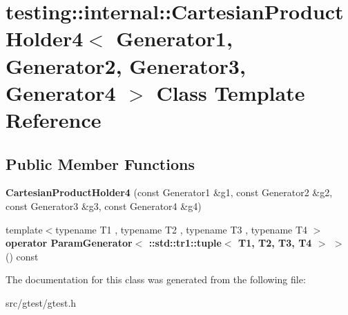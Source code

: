 \hypertarget{classtesting_1_1internal_1_1_cartesian_product_holder4}{}\section{testing\+:\+:internal\+:\+:Cartesian\+Product\+Holder4$<$ Generator1, Generator2, Generator3, Generator4 $>$ Class Template Reference}
\label{classtesting_1_1internal_1_1_cartesian_product_holder4}
\subsection*{Public Member Functions}
\begin{DoxyCompactItemize}
\item 
\mbox{\label{classtesting_1_1internal_1_1_cartesian_product_holder4_a07fe92a091d7717a159d7ba5f2fe3c75}} 
{\bfseries Cartesian\+Product\+Holder4} (const Generator1 \&g1, const Generator2 \&g2, const Generator3 \&g3, const Generator4 \&g4)
\item 
\mbox{\label{classtesting_1_1internal_1_1_cartesian_product_holder4_a89eaa7a878dd8df514449cb3f82f9439}} 
{\footnotesize template$<$typename T1 , typename T2 , typename T3 , typename T4 $>$ }\\{\bfseries operator Param\+Generator$<$ \+::std\+::tr1\+::tuple$<$ T1, T2, T3, T4 $>$ $>$} () const
\end{DoxyCompactItemize}


The documentation for this class was generated from the following file\+:\begin{DoxyCompactItemize}
\item 
src/gtest/gtest.\+h\end{DoxyCompactItemize}
